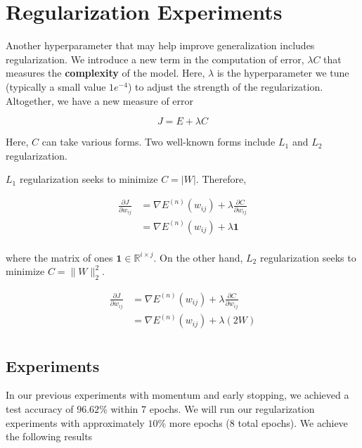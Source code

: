 \section{Regularization Experiments}

Another hyperparameter that may help improve generalization includes
regularization. We introduce a new term in the computation of error, $\lambda C$
that measures the \textbf{complexity} of the model. Here, $\lambda$ is the
hyperparameter we tune (typically a small value $1e^{-4}$) to adjust the
strength of the regularization. Altogether, we have a new measure of error

\begin{equation*}
	J = E + \lambda C
\end{equation*}

Here, $C$ can take various forms. Two well-known forms include $L_1$ and $L_2$
regularization.

$L_1$ regularization seeks to minimize $C = |W|$. Therefore,

\begin{equation*}
	\begin{aligned}
		\frac{\partial J}{\partial w_{ij}} & = \nabla E^{(n)}(w_{ij}) + \lambda
		\frac{\partial C}{\partial w_{ij}}                                      \\
		                                   & = \nabla E^{(n)}(w_{ij}) + \lambda
		\mathbf{1}                                                              \\
	\end{aligned}
\end{equation*}

where the matrix of ones $\mathbf{1} \in \mathbb{R}^{i \times j}$. On the other
hand, $L_2$ regularization seeks to minimize $C = \| W \|^2_2$.

\begin{equation*}
	\begin{aligned}
		\frac{\partial J}{\partial w_{ij}} & = \nabla E^{(n)}(w_{ij}) + \lambda
		\frac{\partial C}{\partial w_{ij}}                                      \\
		                                   & = \nabla E^{(n)}(w_{ij}) + \lambda
		\left( 2  W \right)                                                     \\
	\end{aligned}
\end{equation*}

\subsection{Experiments}
In our previous experiments with momentum and early stopping, we achieved a test
accuracy of $96.62\%$ within 7 epochs. We will run our regularization
experiments with approximately $10\%$ more epochs (8 total epochs). We achieve
the following results

